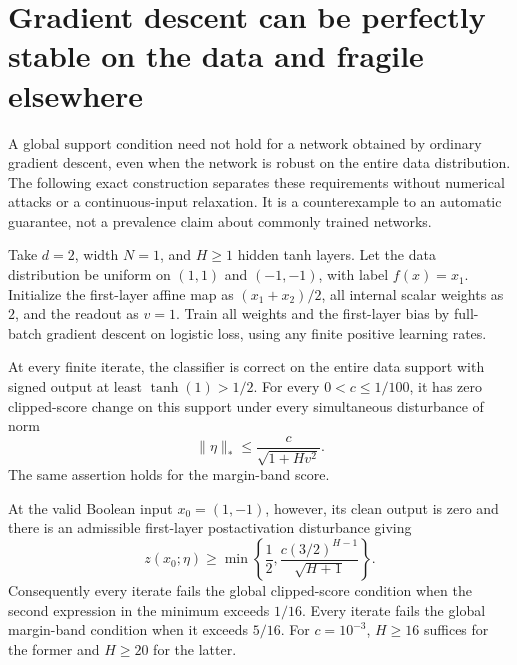 \section{Gradient descent can be perfectly stable on the data and fragile elsewhere}
\label{sec:analytic-gd-counterexample}

A global support condition need not hold for a network obtained by
ordinary gradient descent, even when the network is robust on the entire
data distribution. The following exact construction separates these
requirements without numerical attacks or a continuous-input relaxation.
It is a counterexample to an automatic guarantee, not a prevalence claim
about commonly trained networks.

\begin{proposition}
\label{prop:analytic-gd-counterexample}
Take $d=2$, width $N=1$, and $H\ge1$ hidden tanh layers. Let the data
distribution be uniform on $(1,1)$ and $(-1,-1)$, with label $f(x)=x_1$.
Initialize the first-layer affine map as $(x_1+x_2)/2$, all internal
scalar weights as $2$, and the readout as $v=1$. Train all weights and
the first-layer bias by full-batch gradient descent on logistic loss,
using any finite positive learning rates.

At every finite iterate, the classifier is correct on the entire data
support with signed output at least $\tanh(1)>1/2$. For every
$0<c\le1/100$, it has zero clipped-score change on this support under
every simultaneous disturbance of norm
\[
 \|\eta\|_*\le\frac{c}{\sqrt{1+Hv^2}}.
\]
The same assertion holds for the margin-band score.

At the valid Boolean input $x_0=(1,-1)$, however, its clean output is zero
and there is an admissible first-layer postactivation disturbance giving
\begin{equation}\label{eq:gd-offdata-amplification}
 z(x_0;\eta)\ge
 \min\left\{\frac12,
       \frac{c(3/2)^{H-1}}{\sqrt{H+1}}\right\}.
\end{equation}
Consequently every iterate fails the global clipped-score condition
when the second expression in the minimum exceeds $1/16$. Every iterate
fails the global margin-band condition when it exceeds $5/16$.
For $c=10^{-3}$, $H\ge16$ suffices for the former and $H\ge20$ for the
latter.
\end{proposition}

